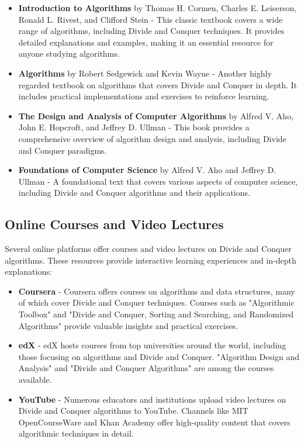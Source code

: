 \documentclass[12pt]{book} %
\begin{document}
\begin{itemize}
    \item \textbf{Introduction to Algorithms} by Thomas H. Cormen, Charles E. Leiserson, Ronald L. Rivest, and Clifford Stein - This classic textbook covers a wide range of algorithms, including Divide and Conquer techniques. It provides detailed explanations and examples, making it an essential resource for anyone studying algorithms.
    
    \item \textbf{Algorithms} by Robert Sedgewick and Kevin Wayne - Another highly regarded textbook on algorithms that covers Divide and Conquer in depth. It includes practical implementations and exercises to reinforce learning.
    
    \item \textbf{The Design and Analysis of Computer Algorithms} by Alfred V. Aho, John E. Hopcroft, and Jeffrey D. Ullman - This book provides a comprehensive overview of algorithm design and analysis, including Divide and Conquer paradigms.
    
    \item \textbf{Foundations of Computer Science} by Alfred V. Aho and Jeffrey D. Ullman - A foundational text that covers various aspects of computer science, including Divide and Conquer algorithms and their applications.
\end{itemize}

\subsection{Online Courses and Video Lectures}
Several online platforms offer courses and video lectures on Divide and Conquer algorithms. These resources provide interactive learning experiences and in-depth explanations:

\begin{itemize}
    \item \textbf{Coursera} - Coursera offers courses on algorithms and data structures, many of which cover Divide and Conquer techniques. Courses such as "Algorithmic Toolbox" and "Divide and Conquer, Sorting and Searching, and Randomized Algorithms" provide valuable insights and practical exercises.
    
    \item \textbf{edX} - edX hosts courses from top universities around the world, including those focusing on algorithms and Divide and Conquer. "Algorithm Design and Analysis" and "Divide and Conquer Algorithms" are among the courses available.
    
    \item \textbf{YouTube} - Numerous educators and institutions upload video lectures on Divide and Conquer algorithms to YouTube. Channels like MIT OpenCourseWare and Khan Academy offer high-quality content that covers algorithmic techniques in detail.
\end{itemize}
\end{document}
